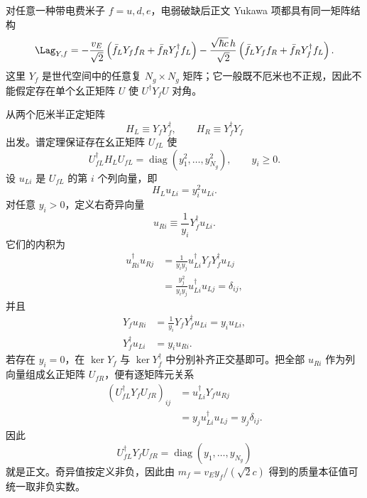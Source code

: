 \begin{derivation}
对任意一种带电费米子 $f=u,d,e$，电弱破缺后正文 Yukawa 项都具有同一矩阵结构
\begin{equation*}
 \Lag_{Y,f}
 =-\frac{v_E}{\sqrt2}
 \left(\bar f_LY_ff_R+\bar f_RY_f^\dagger f_L\right)
 -\frac{\sqrt{\hbar c}\,h}{\sqrt2}
 \left(\bar f_LY_ff_R+\bar f_RY_f^\dagger f_L\right).
\end{equation*}
这里 $Y_f$ 是世代空间中的任意复 $N_g\times N_g$ 矩阵；它一般既不厄米也不正规，因此不能假定存在单个幺正矩阵 $U$ 使 $U^\dagger Y_fU$ 对角。

从两个厄米半正定矩阵
\begin{equation*}
 H_L\equiv Y_fY_f^\dagger,
 \qquad
 H_R\equiv Y_f^\dagger Y_f
\end{equation*}
出发。谱定理保证存在幺正矩阵 $U_{fL}$ 使
\begin{equation*}
 U_{fL}^\dagger H_LU_{fL}
 =\operatorname{diag}(y_1^2,\ldots,y_{N_g}^2),
 \qquad y_i\ge0.
\end{equation*}
设 $u_{Li}$ 是 $U_{fL}$ 的第 $i$ 个列向量，即
\begin{equation*}
 H_Lu_{Li}=y_i^2u_{Li}.
\end{equation*}
对任意 $y_i>0$，定义右奇异向量
\begin{equation*}
 u_{Ri}\equiv\frac1{y_i}Y_f^\dagger u_{Li}.
\end{equation*}
它们的内积为
\begin{align*}
 u_{Ri}^\dagger u_{Rj}
 &=\frac1{y_iy_j}
 u_{Li}^\dagger Y_fY_f^\dagger u_{Lj}\\
 &=\frac{y_j^2}{y_iy_j}u_{Li}^\dagger u_{Lj}
 =\delta_{ij},
\end{align*}
并且
\begin{align*}
 Y_fu_{Ri}
 &=\frac1{y_i}Y_fY_f^\dagger u_{Li}
 =y_i u_{Li},\\
 Y_f^\dagger u_{Li}
 &=y_i u_{Ri}.
\end{align*}
若存在 $y_i=0$，在 $\ker Y_f$ 与 $\ker Y_f^\dagger$ 中分别补齐正交基即可。把全部 $u_{Ri}$ 作为列向量组成幺正矩阵 $U_{fR}$，便有逐矩阵元关系
\begin{align*}
 (U_{fL}^\dagger Y_fU_{fR})_{ij}
 &=u_{Li}^\dagger Y_fu_{Rj}\\
 &=y_j u_{Li}^\dagger u_{Lj}
 =y_j\delta_{ij}.
\end{align*}
因此
\begin{equation*}
 {
 U_{fL}^\dagger Y_fU_{fR}
 =\operatorname{diag}(y_1,\ldots,y_{N_g})}
\end{equation*}
就是正文。奇异值按定义非负，因此由 $m_f=v_E y_f/(\sqrt2 c)$ 得到的质量本征值可统一取非负实数。


\end{derivation}

